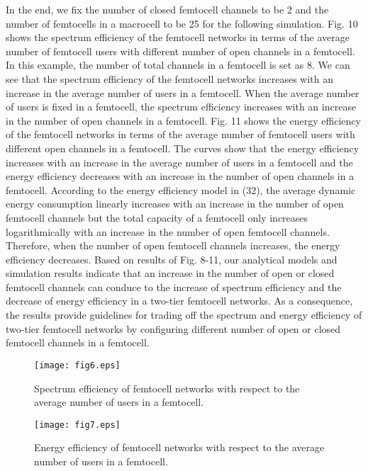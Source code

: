 \documentclass[10pt,final,journal,letterpaper,twoside,twocolumn]{IEEEtran}
\begin{document}
In the end, we fix the number of closed femtocell channels to be 2 and the number of femtocells in a macrocell to be 25 for the following simulation. Fig. 10 shows the spectrum efficiency of the femtocell networks in terms of
the average number of femtocell users with different number of open channels in a femtocell. In
this example, the number of total channels in a femtocell is set as 8. We can
see that the spectrum efficiency of the femtocell networks increases with
an increase in the average number of users in a femtocell. When the average number of users is fixed in a femtocell, the spectrum efficiency increases with an increase in the number of open
channels in a femtocell. Fig. 11 shows the energy efficiency of the femtocell
networks in terms of the average number of femtocell users with different open
channels in a femtocell. The curves show that the energy efficiency
increases with an increase in the average number of users in a femtocell and the energy efficiency decreases with an increase in the number of open channels in a femtocell.
According to the energy efficiency model in (32), the average dynamic energy consumption linearly increases with an increase in the number of open femtocell channels but the total capacity of
a femtocell only increases logarithmically with an increase in the number of open femtocell channels. Therefore, when the number of open femtocell channels increases, the energy efficiency decreases. Based on results of Fig. 8-11, our analytical models and simulation results indicate that an increase in the number of open or closed femtocell channels can
conduce to the increase of spectrum efficiency and the decrease of energy efficiency in a two-tier femtocell networks. As a consequence, the results provide guidelines for trading off the spectrum
and energy efficiency of two-tier femtocell networks by configuring different number of open or closed femtocell channels in a femtocell.
\begin{figure}
\vspace{0.1in}
\centerline{\texttt{[image: fig6.eps]}}
\caption{\small  Spectrum efficiency of femtocell networks with respect to
the average number of users in a femtocell.}
\end{figure}
\begin{figure}
\vspace{0.1in}
\centerline{\texttt{[image: fig7.eps]}}
\caption{\small  Energy efficiency of femtocell networks with respect to the
average number of users in a femtocell.}
\end{figure}
\end{document}
